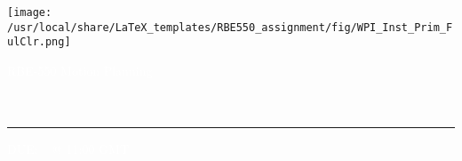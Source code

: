 \begin{titlepage}
\BgThispage
{}
\noindent
\vspace*{0.10\textheight}
\texttt{[image: /usr/local/share/LaTeX\_templates/RBE550\_assignment/fig/WPI\_Inst\_Prim\_FulClr.png]}%
\noindent
\begin{flushright}
\textcolor{white}{\sffamily RBE-550 Motion Planning\\%
\small{\printauthor} \\%
\Huge\sffamily\textbf{\assignmenttype~\assignmentnumber\\\assignmenttitle}}
\end{flushright}
\vspace*{2cm}\par
\noindent
\begin{minipage}{0.35\linewidth}
 \begin{flushright}
 \end{flushright}
\end{minipage} \hspace{14pt}
%
%
\begin{minipage}{0.02\linewidth}
\textcolor{white}{\rule{1pt}{175pt}}
\end{minipage} \hspace{-10pt}
%
\begin{minipage}{0.63\linewidth}
\vspace{5pt}
\textcolor{white}{%
\sffamily%
{\Large{DUE: \assignmentdue ~ @ 11:00 GMT}}} \\
%
\textcolor{white}{%
\assignmentabstract%
}
\end{minipage}
\end{titlepage}
\restoregeometry

